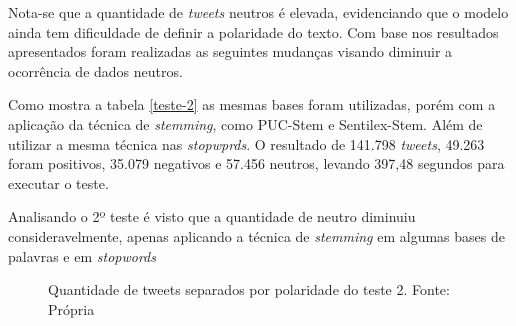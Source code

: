 Nota-se que a quantidade de \textit{tweets} neutros é elevada, evidenciando que o modelo ainda tem dificuldade de definir a polaridade do texto. Com base nos resultados apresentados foram realizadas as seguintes mudanças visando diminuir a ocorrência de dados neutros.
 
Como mostra a tabela \ref{teste-2} as mesmas bases foram utilizadas, porém com a aplicação da técnica de \textit{stemming}, como  PUC-Stem e Sentilex-Stem. Além de utilizar a mesma técnica nas  \textit{stopwprds}. O resultado de 141.798 \textit{tweets}, 49.263 foram positivos, 35.079 negativos e 57.456 neutros, levando 397,48 segundos para executar o teste.
\begin{table}[]
	\caption{2º teste}
	\label{teste-2}
\end{table}

Analisando o 2º teste é visto que a quantidade de neutro diminuiu consideravelmente, apenas aplicando a técnica de \textit{stemming} em algumas bases de palavras e em \textit{stopwords}
\begin{figure}[!h]
	\centering{}
	\caption{Quantidade de tweets separados por polaridade do teste 2. Fonte: Própria}
	\label{teste-graf-2}
\end{figure}

